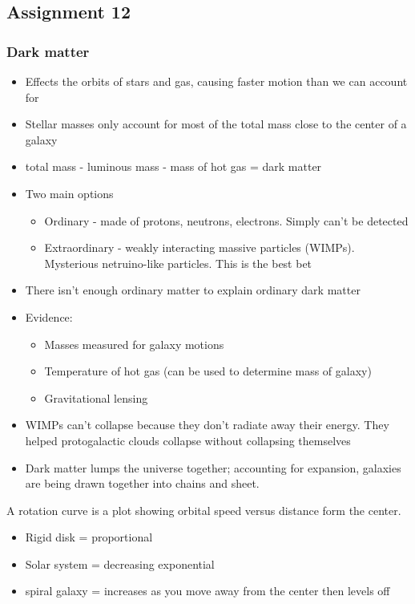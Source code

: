 \subsection{Assignment 12}
\subsubsection{Dark matter}
\begin{itemize}
\item Effects the orbits of stars and gas, causing faster motion than we can account for
\item Stellar masses only account for most of the total mass close to the center of a galaxy
\item total mass - luminous mass - mass of hot gas = dark matter
\item Two main options
\begin{itemize}
\item Ordinary - made of protons, neutrons, electrons.  Simply can't be detected
\item Extraordinary - weakly interacting massive particles (WIMPs).  Mysterious netruino-like particles.  This is the best bet
\end{itemize}
\item There isn't enough ordinary matter to explain ordinary dark matter
\item Evidence:
\begin{itemize}
\item Masses measured for galaxy motions
\item Temperature of hot gas (can be used to determine mass of galaxy)
\item Gravitational lensing
\end{itemize}
\item WIMPs can't collapse because they don't radiate away their energy.  They helped protogalactic clouds collapse without collapsing themselves
\item Dark matter lumps the universe together; accounting for expansion, galaxies are being drawn together into chains and sheet.
\end{itemize}

A rotation curve is a plot showing orbital speed versus distance form the center.
\begin{itemize}
\item Rigid disk = proportional
\item Solar system = decreasing exponential
\item spiral galaxy = increases as you move away from the center then levels off
\end{itemize}

